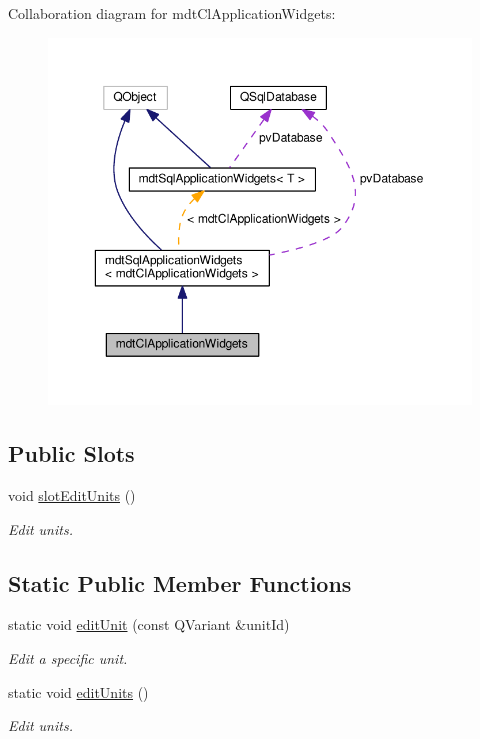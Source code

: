 Collaboration diagram for mdt\-Cl\-Application\-Widgets\-:\nopagebreak
\begin{figure}[H]
\begin{center}
\leavevmode
\includegraphics[width=350pt]{classmdt_cl_application_widgets__coll__graph}
\end{center}
\end{figure}
\subsection*{Public Slots}
\begin{DoxyCompactItemize}
\item 
void \hyperlink{classmdt_cl_application_widgets_a2ae755a028947afe4ebf89a19029baf8}{slot\-Edit\-Units} ()
\begin{DoxyCompactList}\small\item\em Edit units. \end{DoxyCompactList}\end{DoxyCompactItemize}
\subsection*{Static Public Member Functions}
\begin{DoxyCompactItemize}
\item 
static void \hyperlink{classmdt_cl_application_widgets_a7abdfc14123af0dab942ee26a58f444d}{edit\-Unit} (const Q\-Variant \&unit\-Id)
\begin{DoxyCompactList}\small\item\em Edit a specific unit. \end{DoxyCompactList}\item 
static void \hyperlink{classmdt_cl_application_widgets_ac2aba225fcd32d36520a3d525368be34}{edit\-Units} ()
\begin{DoxyCompactList}\small\item\em Edit units. \end{DoxyCompactList}\end{DoxyCompactItemize}

